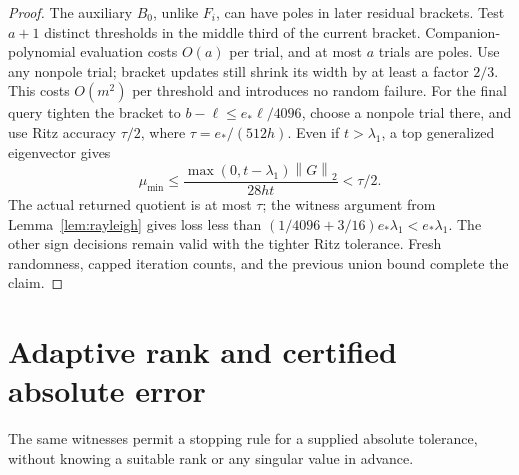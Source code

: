 \documentclass[11pt]{article}
\newcommand{\norm}[1]{\left\lVert#1\right\rVert}
\begin{document}
\begin{proof}
The auxiliary \(B_0\), unlike \(F_i\), can have poles in later
residual brackets. Test \(a+1\) distinct thresholds in the middle third
of the current bracket. Companion-polynomial evaluation costs \(O(a)\)
per trial, and at most \(a\) trials are poles. Use any nonpole trial;
bracket updates still shrink its width by at least a factor \(2/3\).
This costs \(O(m^2)\) per threshold and introduces no random failure.
For the final query tighten the bracket to
\(b-\ell\leq e_*\ell/4096\), choose a nonpole trial there, and use
Ritz accuracy \(\tau/2\), where \(\tau=e_*/(512h)\).
Even if \(t>\lambda_1\), a top generalized eigenvector gives
\[
 \mu_{\min}\leq
 \frac{\max(0,t-\lambda_1)\norm G_2}{28ht}<\tau/2.
 \]
The actual returned quotient is at most \(\tau\); the witness argument
from Lemma~\ref{lem:rayleigh} gives loss less than
\((1/4096+3/16)e_*\lambda_1<e_*\lambda_1\).
The other sign decisions remain valid with the tighter Ritz tolerance.
Fresh randomness, capped iteration counts, and the previous union bound
complete the claim.
\end{proof}

\section{Adaptive rank and certified absolute error}
The same witnesses permit a stopping rule for a supplied absolute tolerance,
without knowing a suitable rank or any singular value in advance.
\end{document}
